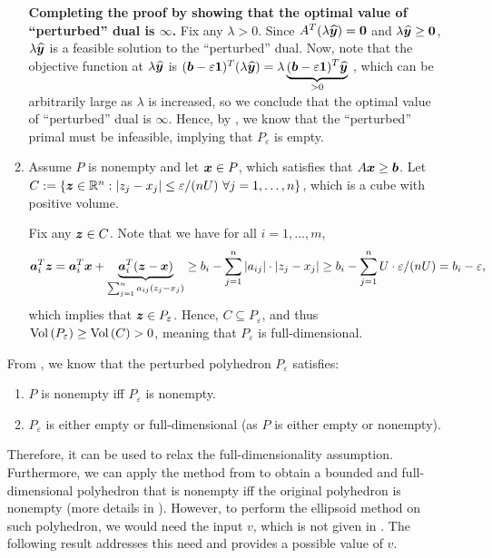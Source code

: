 \begin{enumerate}
\begin{pf}
\begin{enumerate}
\textbf{Completing the proof by showing that the optimal value of ``perturbed''
dual is \(\infty\).}
Fix any \(\lambda>0\). Since \(A^{T}(\lambda\widehat{\bm{y}})=\bm{0}\) and
\(\lambda\widehat{\bm{y}}\ge\bm{0}\), \(\lambda\widehat{\bm{y}}\) is a
feasible solution to the ``perturbed'' dual. Now, note that the objective function
at \(\lambda\widehat{\bm{y}}\) is
\((\bm{b}-\varepsilon\bm{1})^{T}(\lambda\widehat{\bm{y}})
=\lambda\underbrace{(\bm{b}-\varepsilon\bm{1})^{T}\widehat{\bm{y}}}_{>0}\)
, which can be arbitrarily large as \(\lambda\) is increased, so we conclude
that the optimal value of ``perturbed'' dual is \(\infty\).
Hence, by , we know that the ``perturbed''
primal must be infeasible, implying that \(P_{\varepsilon}\) is empty.
\item Assume \(P\) is nonempty and let \(\bm{x}\in P\), which satisfies that
\(A\bm{x}\ge\bm{b}\). Let \(C:=\{\bm{z}\in\mathbb{R}^n:|z_j-x_j|\le
\varepsilon/(nU)~\forall j=1,\dotsc,n\}\), which is a cube with positive volume.

Fix any \(\bm{z}\in C\). Note that we have for all \(i=1,\dotsc,m\),
\[
\bm{a}_i^{T}\bm{z}
=\bm{a}_{i}^{T}\bm{x}+\underbrace{\bm{a}_{i}^{T}(\bm{z}-\bm{x})}_{
\sum_{j=1}^{n}a_{ij}(z_j-x_j)}
\ge b_i-\sum_{j=1}^{n}|a_{ij}|\cdot |z_j-x_j|
\ge b_i-\sum_{j=1}^{n}U\cdot \varepsilon/(nU)
=b_i-\varepsilon,
\]
which implies that \(\bm{z}\in P_{\varepsilon}\). Hence, \(C\subseteq P_{\varepsilon}\),
and thus \(\operatorname{Vol}\left(P_{\varepsilon}\right)\ge\operatorname{Vol}\left(C\right)>0\), meaning that
\(P_{\varepsilon}\) is full-dimensional.
\end{enumerate}
\end{pf}

From , we know that the perturbed
polyhedron \(P_{\varepsilon}\) satisfies:
\begin{enumerate}
\item \(P\) is nonempty iff \(P_{\varepsilon}\) is nonempty.
\item \(P_{\varepsilon}\) is either empty or full-dimensional (as \(P\) is
either empty or nonempty).
\end{enumerate}
Therefore, it can be used to relax the full-dimensionality assumption.
Furthermore, we can apply the method from  to
obtain a bounded and full-dimensional polyhedron that is nonempty iff the
original polyhedron is nonempty (more details in
).
However, to perform the ellipsoid method on such polyhedron, we would need the
input \(v\), which is not given in .
The following result addresses this need and provides a possible value of
\(v\).


\end{enumerate}
